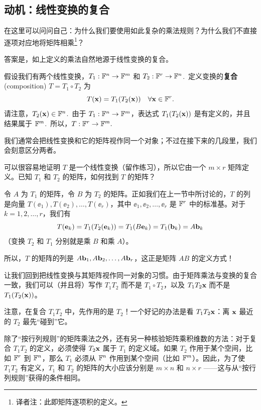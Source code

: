 \subsection{动机：线性变换的复合}\label{sec:01-05-02}

在这里可以问问自己：为什么我们要使用如此复杂的乘法规则？为什么我们不直接逐项对应地将矩阵相乘\footnote{译者注：此即矩阵逐项积的定义。}？

答案是，如上定义的乘法自然地源于线性变换的复合。

假设我们有两个线性变换，$T_1: \mathbb{F}^n \to \mathbb{F}^m$ 和 $T_2: \mathbb{F}^r \to \mathbb{F}^n$.~定义变换的\textbf{复合}(composition) $T = T_1 \circ T_2$ 为
$$T(\mathbf{x}) = T_1(T_2(\mathbf{x})) ~~\ \forall \mathbf{x} \in \mathbb{F}^r.$$
请注意，$T_2(\mathbf{x}) \in \mathbb{F}^n$.~由于 $T_1: \mathbb{F}^n \to \mathbb{F}^m$，表达式 $T_1(T_2(\mathbf{x}))$ 是有定义的，并且结果属于 $\mathbb{F}^m$.~所以，$T: \mathbb{F}^r \to \mathbb{F}^m.$
\begin{remark*}
我们通常会把线性变换和它的矩阵视作同一个对象；不过在接下来的几段里，我们会刻意区分两者。
\end{remark*}

可以很容易地证明 $T$ 是一个线性变换（留作练习），所以它由一个 $m \times r$ 矩阵定义。已知 $T_1$ 和 $T_2$ 的矩阵，如何找到 $T$ 的矩阵？

令 $A$ 为 $T_1$ 的矩阵，令 $B$ 为 $T_2$ 的矩阵。正如我们在上一节中所讨论的，$T$ 的列是向量 $T(\ee_1), T(\ee_2), \dots, T(\ee_r)$，其中 $\ee_1, \ee_2, \dots, \ee_r$ 是 $\mathbb{F}^r$ 中的标准基。对于 $k = 1, 2, \dots, r$，我们有
$$T(\mathbf{e}_k) = T_1(T_2(\mathbf{e}_k)) = T_1(B \mathbf{e}_k) = T_1(\mathbf{b}_k) = A \mathbf{b}_k$$
（变换 $T_2$ 和 $T_1$ 分别就是乘 $B$ 和乘 $A$）。

所以，$T$ 的矩阵的列是 $A \mathbf{b}_1, A \mathbf{b}_2, \dots, A \mathbf{b}_r$，这正是矩阵 $AB$ 的定义方式！

让我们回到把线性变换与其矩阵视作同一对象的习惯。由于矩阵乘法与变换的复合一致，我们可以（并且将）写作 $T_1T_2$ 而不是 $T_1\circ T_2$，以及 $T_1T_2\mathbf{x}$ 而不是 $T_1(T_2(\mathbf{x}))$。

\begin{remark*}
注意，在复合 $T_1T_2$ 中，先作用的是 $T_2$！一个好记的办法是看 $T_1T_2\mathbf{x}$：离 $\mathbf{x}$ 最近的 $T_2$ 最先“碰到”它。
\end{remark*}

\begin{remark*}
除了“按行列规则”的矩阵乘法之外，还有另一种核验矩阵乘积维数的方法：对于复合 $T_1 T_2$ 的定义，必须使得 $T_2 \mathbf{x}$ 属于 $T_1$ 的定义域。如果 $T_2$ 作用于某个空间，比如 $\mathbb{F}^r$ 到 $\mathbb{F}^n$，那么 $T_1$ 必须从 $\mathbb{F}^n$ 作用到某个空间（比如 $\mathbb{F}^m$）。因此，为了使 $T_1 T_2$ 有定义，$T_1$ 和 $T_2$ 的矩阵的大小应该分别是 $m \times n$ 和 $n \times r$ ——这与从“按行列规则”获得的条件相同。
\end{remark*}

